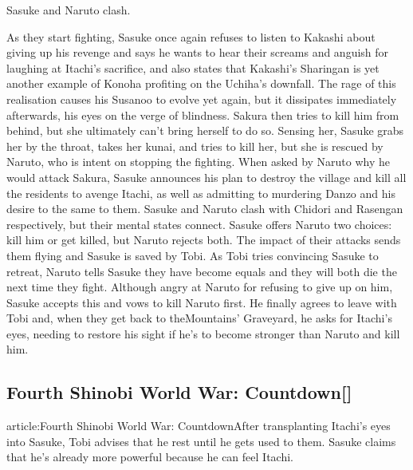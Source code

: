\documentclass[a4paper,12pt]{article}
\begin{document}
Sasuke and Naruto clash.\\ \par \vspace{0.5cm}

As they start fighting, Sasuke once again refuses to listen to Kakashi about giving up his revenge and says he wants to hear their screams and anguish for laughing at Itachi's sacrifice, and also states that Kakashi's Sharingan is yet another example of Konoha profiting on the Uchiha's downfall. The rage of this realisation causes his Susanoo to evolve yet again, but it dissipates immediately afterwards, his eyes on the verge of blindness. Sakura then tries to kill him from behind, but she ultimately can't bring herself to do so. Sensing her, Sasuke grabs her by the throat, takes her kunai, and tries to kill her, but she is rescued by Naruto, who is intent on stopping the fighting. When asked by Naruto why he would attack Sakura, Sasuke announces his plan to destroy the village and kill all the residents to avenge Itachi, as well as admitting to murdering Danzo and his desire to the same to them. Sasuke and Naruto clash with Chidori and Rasengan respectively, but their mental states connect. Sasuke offers Naruto two choices: kill him or get killed, but Naruto rejects both. The impact of their attacks sends them flying and Sasuke is saved by Tobi. As Tobi tries convincing Sasuke to retreat, Naruto tells Sasuke they have become equals and they will both die the next time they fight. Although angry at Naruto for refusing to give up on him, Sasuke accepts this and vows to kill Naruto first. He finally agrees to leave with Tobi and, when they get back to theMountains' Graveyard, he asks for Itachi's eyes, needing to restore his sight if he's to become stronger than Naruto and kill him.\\ \par \vspace{0.5cm}

\subsection*{Fourth Shinobi World War: Countdown[]}\n\nMain article:Fourth Shinobi World War: CountdownAfter transplanting Itachi's eyes into Sasuke, Tobi advises that he rest until he gets used to them. Sasuke claims that he's already more powerful because he can feel Itachi.\\ \par \vspace{0.5cm}
\end{document}
